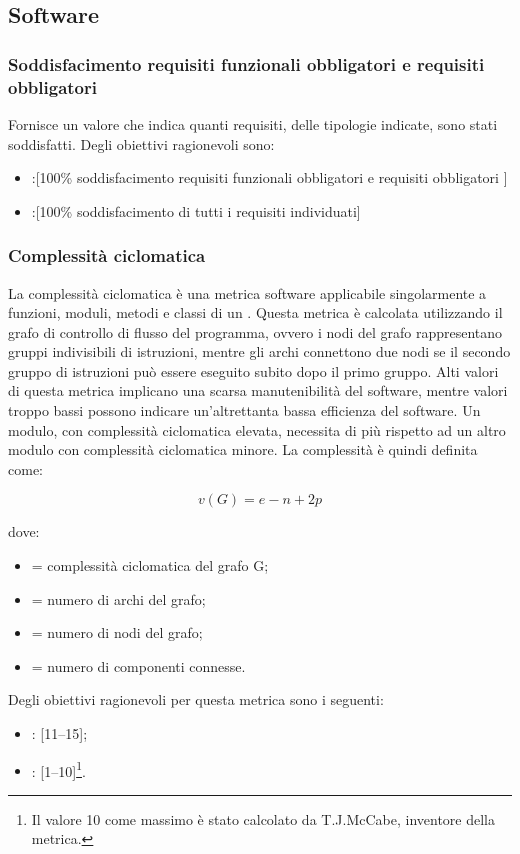 \subsection{Software}
\subsubsection{Soddisfacimento requisiti funzionali obbligatori e requisiti obbligatori}
Fornisce un valore che indica quanti requisiti, delle tipologie indicate, sono stati soddisfatti.
Degli obiettivi ragionevoli sono:
\begin{itemize}
\item {}:[100\% soddisfacimento requisiti funzionali obbligatori e requisiti obbligatori ]
\item {}:[100\% soddisfacimento di tutti i requisiti individuati]
\end{itemize}

\subsubsection{Complessità ciclomatica}
\label{4.2.1}
La complessità ciclomatica è una metrica software applicabile singolarmente a funzioni, moduli, metodi e classi di un .
Questa metrica è calcolata utilizzando il grafo di controllo di flusso del programma, ovvero i nodi del grafo rappresentano gruppi indivisibili di istruzioni, mentre gli archi connettono due nodi se il secondo gruppo di istruzioni può essere eseguito subito dopo il primo gruppo.
Alti valori di questa metrica implicano una scarsa manutenibilità del software, mentre valori troppo bassi possono indicare un'altrettanta bassa efficienza del software.
Un modulo, con complessità ciclomatica elevata, necessita di più  rispetto ad un altro modulo con complessità ciclomatica minore.
La complessità è quindi definita come:

$$v(G) = e - n + 2p$$

dove:
\begin{itemize}
\item {} = complessità ciclomatica del grafo G;
\item {} = numero di archi del grafo;
\item {} = numero di nodi del grafo;
\item {} = numero di componenti connesse.
\end{itemize}
Degli obiettivi ragionevoli per questa metrica sono i seguenti:
\begin{itemize}
\item {}: [11--15];
\item {}: [1--10]\footnote{Il valore 10 come massimo è stato calcolato da T.J.McCabe, inventore della metrica.}.
\end{itemize}

